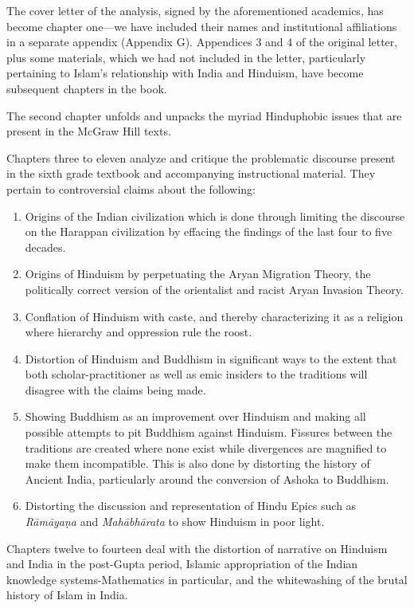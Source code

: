 The cover letter of the analysis, signed by the aforementioned academics, has become chapter one—we have included their names and institutional affiliations in a separate appendix (Appendix G). Appendices 3 and 4 of the original letter, plus some materials, which we had not included in the letter, particularly pertaining to Islam’s relationship with India and Hinduism, have become subsequent chapters in the book. 

The second chapter unfolds and unpacks the myriad Hinduphobic issues that are present in the McGraw Hill texts.

Chapters three to eleven analyze and critique the problematic discourse present in the sixth grade textbook and accompanying instructional material. They pertain to controversial claims about the following:
\begin{enumerate}
\item Origins of the Indian civilization which is done through limiting the discourse on the Harappan civilization by effacing the findings of the last four to five decades.
\item Origins of Hinduism by perpetuating the Aryan Migration Theory, the politically correct version of the orientalist and racist Aryan Invasion Theory. 
\item Conflation of Hinduism with caste, and thereby characterizing it as a religion where hierarchy and oppression rule the roost. 
\item Distortion of Hinduism and Buddhism in significant ways to the extent that both scholar-practitioner as well as emic insiders to the traditions will disagree with the claims being made. 
\item Showing Buddhism as an improvement over Hinduism and making all possible attempts to pit Buddhism against Hinduism. Fissures between the traditions are created where none exist while divergences are magnified to make them incompatible. This is also done by distorting the history of Ancient India, particularly around the conversion of Ashoka to Buddhism. 
\item Distorting the discussion and representation of Hindu Epics such as \textit{Rāmāyaṇa} and \textit{Mahābhārata} to show Hinduism in poor light. 
\end{enumerate}
Chapters twelve to fourteen deal with the distortion of narrative on Hinduism and India in the post-Gupta period, Islamic appropriation of the Indian knowledge systems-Mathematics in particular, and the whitewashing of the brutal history of Islam in India. 
